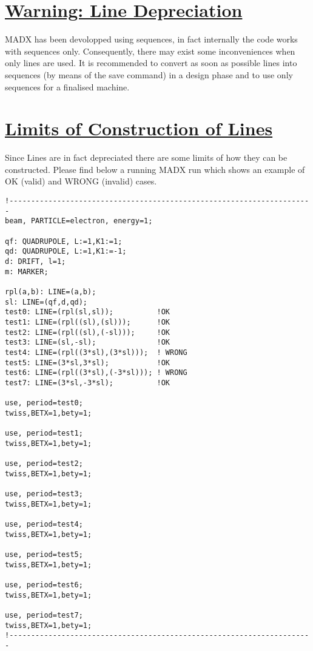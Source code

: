 \section{\href{Line_Depreciation}{Warning: Line Depreciation}} 
MADX has been devolopped using sequences, in fact internally the code
works with sequences only. Consequently, there may exist some
inconveniences when only lines are used. It is recommended to convert as
soon as possible lines into sequences (by means of the save command) in
a design phase and to use only sequences for a finalised machine.    

\section{\href{Line_Limits}{ Limits of Construction of Lines}}  
Since Lines are in fact depreciated there are some limits of how they
can be constructed. Please find below a running MADX run which shows an
example of OK (valid) and WRONG (invalid) cases.   

\begin{verbatim}
!----------------------------------------------------------------------
beam, PARTICLE=electron, energy=1;

qf: QUADRUPOLE, L:=1,K1:=1;
qd: QUADRUPOLE, L:=1,K1:=-1;
d: DRIFT, l=1;
m: MARKER;

rpl(a,b): LINE=(a,b);
sl: LINE=(qf,d,qd);
test0: LINE=(rpl(sl,sl));          !OK 
test1: LINE=(rpl((sl),(sl)));      !OK
test2: LINE=(rpl((sl),(-sl)));     !OK
test3: LINE=(sl,-sl);              !OK
test4: LINE=(rpl((3*sl),(3*sl)));  ! WRONG
test5: LINE=(3*sl,3*sl);           !OK
test6: LINE=(rpl((3*sl),(-3*sl))); ! WRONG
test7: LINE=(3*sl,-3*sl);          !OK

use, period=test0;
twiss,BETX=1,bety=1;

use, period=test1;
twiss,BETX=1,bety=1;

use, period=test2;
twiss,BETX=1,bety=1;

use, period=test3;
twiss,BETX=1,bety=1;

use, period=test4;
twiss,BETX=1,bety=1;

use, period=test5;
twiss,BETX=1,bety=1;

use, period=test6;
twiss,BETX=1,bety=1;

use, period=test7;
twiss,BETX=1,bety=1;
!----------------------------------------------------------------------
\end{verbatim}


